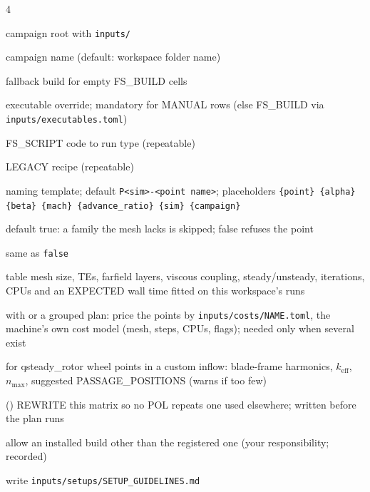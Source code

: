 \begin{multicols}{4}
\begin{flags}
\item {} campaign root with \texttt{inputs/}
\item {} campaign name (default: workspace folder name)
\item {} fallback build for empty FS\_BUILD cells
\item {} executable override; mandatory for MANUAL rows (else FS\_BUILD via \texttt{inputs/executables.toml})
\item {} FS\_SCRIPT code to run type (repeatable)
\item {} LEGACY recipe (repeatable)
\item {} naming template; default \texttt{P<sim>-<point name>}; placeholders \texttt{\{point\} \{alpha\} \{beta\} \{mach\} \{advance\_ratio\} \{sim\} \{campaign\}}
\item {} default true: a family the mesh lacks is skipped; false refuses the point
\item {} same as \texttt{false}
\item {} table mesh size, TEs, farfield layers, viscous coupling, steady/unsteady, iterations, CPUs and an EXPECTED wall time fitted on this workspace's runs
\item {} with  or a grouped plan: price the points by \texttt{inputs/costs/NAME.toml}, the machine's own cost model (mesh, steps, CPUs, flags); needed only when several exist
\item {} for qsteady\_rotor wheel points in a custom inflow: blade-frame harmonics, \(k_{\mathrm{eff}}\), \(n_{\max}\), suggested PASSAGE\_POSITIONS (warns if too few)
\item {} () REWRITE this matrix so no POL repeats one used elsewhere; written before the plan runs
\item {} allow an installed build other than the registered one (your responsibility; recorded)
\item {} write \texttt{inputs/setups/SETUP\_GUIDELINES.md}

\end{flags}
\end{multicols}
